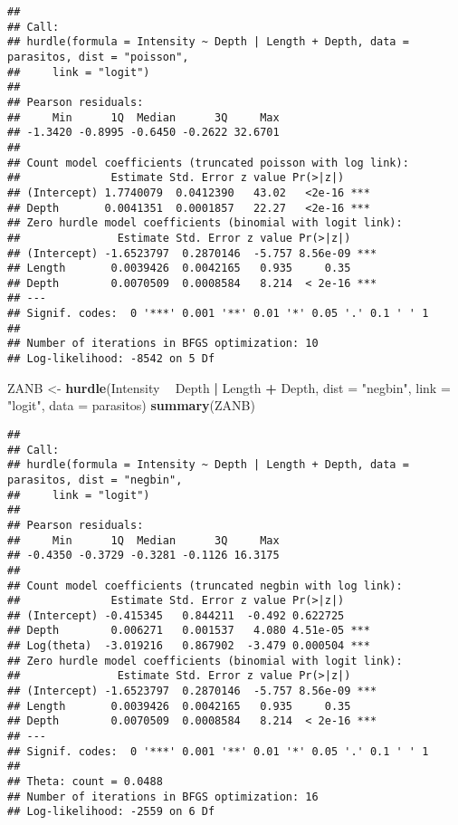 \documentclass[
]{book}
\newenvironment{Shaded}{\begin{snugshade}}{\end{snugshade}}
\newcommand{\DataTypeTok}[1]{\textcolor[rgb]{0.13,0.29,0.53}{#1}}
\newcommand{\KeywordTok}[1]{\textcolor[rgb]{0.13,0.29,0.53}{\textbf{#1}}}
\newcommand{\NormalTok}[1]{#1}
\newcommand{\OperatorTok}[1]{\textcolor[rgb]{0.81,0.36,0.00}{\textbf{#1}}}
\newcommand{\StringTok}[1]{\textcolor[rgb]{0.31,0.60,0.02}{#1}}
\begin{document}
\begin{verbatim}
## 
## Call:
## hurdle(formula = Intensity ~ Depth | Length + Depth, data = parasitos, dist = "poisson", 
##     link = "logit")
## 
## Pearson residuals:
##     Min      1Q  Median      3Q     Max 
## -1.3420 -0.8995 -0.6450 -0.2622 32.6701 
## 
## Count model coefficients (truncated poisson with log link):
##              Estimate Std. Error z value Pr(>|z|)    
## (Intercept) 1.7740079  0.0412390   43.02   <2e-16 ***
## Depth       0.0041351  0.0001857   22.27   <2e-16 ***
## Zero hurdle model coefficients (binomial with logit link):
##               Estimate Std. Error z value Pr(>|z|)    
## (Intercept) -1.6523797  0.2870146  -5.757 8.56e-09 ***
## Length       0.0039426  0.0042165   0.935     0.35    
## Depth        0.0070509  0.0008584   8.214  < 2e-16 ***
## ---
## Signif. codes:  0 '***' 0.001 '**' 0.01 '*' 0.05 '.' 0.1 ' ' 1 
## 
## Number of iterations in BFGS optimization: 10 
## Log-likelihood: -8542 on 5 Df
\end{verbatim}

\begin{Shaded}
\begin{Highlighting}[]
\NormalTok{ZANB <-}\StringTok{ }\KeywordTok{hurdle}\NormalTok{(Intensity }\OperatorTok{~}\StringTok{ }\NormalTok{Depth }\OperatorTok{|}\StringTok{ }\NormalTok{Length }\OperatorTok{+}\StringTok{ }\NormalTok{Depth, }\DataTypeTok{dist =} \StringTok{"negbin"}\NormalTok{, }
\DataTypeTok{link =} \StringTok{"logit"}\NormalTok{, }\DataTypeTok{data =}\NormalTok{ parasitos)}
\KeywordTok{summary}\NormalTok{(ZANB)}
\end{Highlighting}
\end{Shaded}

\begin{verbatim}
## 
## Call:
## hurdle(formula = Intensity ~ Depth | Length + Depth, data = parasitos, dist = "negbin", 
##     link = "logit")
## 
## Pearson residuals:
##     Min      1Q  Median      3Q     Max 
## -0.4350 -0.3729 -0.3281 -0.1126 16.3175 
## 
## Count model coefficients (truncated negbin with log link):
##              Estimate Std. Error z value Pr(>|z|)    
## (Intercept) -0.415345   0.844211  -0.492 0.622725    
## Depth        0.006271   0.001537   4.080 4.51e-05 ***
## Log(theta)  -3.019216   0.867902  -3.479 0.000504 ***
## Zero hurdle model coefficients (binomial with logit link):
##               Estimate Std. Error z value Pr(>|z|)    
## (Intercept) -1.6523797  0.2870146  -5.757 8.56e-09 ***
## Length       0.0039426  0.0042165   0.935     0.35    
## Depth        0.0070509  0.0008584   8.214  < 2e-16 ***
## ---
## Signif. codes:  0 '***' 0.001 '**' 0.01 '*' 0.05 '.' 0.1 ' ' 1 
## 
## Theta: count = 0.0488
## Number of iterations in BFGS optimization: 16 
## Log-likelihood: -2559 on 6 Df
\end{verbatim}
\end{document}
